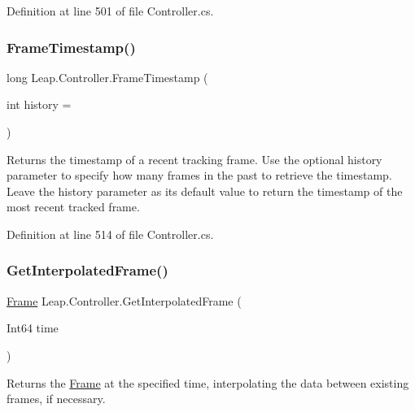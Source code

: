 Definition at line 501 of file Controller.\+cs.

\mbox{\label{class_leap_1_1_controller_a3babd82558546e8bc5de90fb80d201ec}} 
\subsubsection{\texorpdfstring{FrameTimestamp()}{FrameTimestamp()}}
{\footnotesize\ttfamily long Leap.\+Controller.\+Frame\+Timestamp (\begin{DoxyParamCaption}\item[{int}]{history = {} }\end{DoxyParamCaption})}



Returns the timestamp of a recent tracking frame. Use the optional history parameter to specify how many frames in the past to retrieve the timestamp. Leave the history parameter as it\textquotesingle{}s default value to return the timestamp of the most recent tracked frame. 



Definition at line 514 of file Controller.\+cs.

\mbox{\label{class_leap_1_1_controller_aa99cf433f25105c63083d9b6f6ded2e9}} 
\subsubsection{\texorpdfstring{GetInterpolatedFrame()}{GetInterpolatedFrame()}\hspace{0.1cm}{\footnotesize\ttfamily [1/2]}}
{\footnotesize\ttfamily \mbox{\hyperlink{class_leap_1_1_frame}{Frame}} Leap.\+Controller.\+Get\+Interpolated\+Frame (\begin{DoxyParamCaption}\item[{Int64}]{time }\end{DoxyParamCaption})}



Returns the \mbox{\hyperlink{class_leap_1_1_frame}{Frame}} at the specified time, interpolating the data between existing frames, if necessary. 



